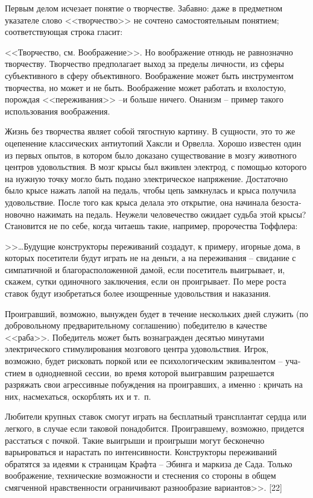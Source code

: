 \documentclass{book}
\begin{document}
Первым делом исчезает понятие о творчестве. Забавно: да­же в предметном указателе слово <<творчество>> не сочтено са­мостоятельным понятием; соответствующая строка гласит:

<<Творчество,  см. Воображение>>.  Но воображение отнюдь не равнозначно творчеству. Творчество предполагает выход за пределы личности, из сферы субъективного в сферу объективного. Воображение может быть инструментом творчества, но может и не быть. Воображение может работать и вхолостую, порож­дая <<переживания>> --и больше ничего. Онанизм -- пример та­кого использования воображения.

Жизнь без творчества являет собой тягостную картину. В сущ­ности, это то же оцепенение классических антиутопий Хаксли и Орвелла. Хорошо известен один из первых опытов, в котором было доказано существование в мозгу животного центров удо­вольствия. В мозг крысы был вживлен электрод, с помощью которого на нужную точку могло быть подано электрическое напряжение. Достаточно было крысе нажать лапой на педаль, чтобы цепь замкнулась и крыса получила удовольствие. Пос­ле того как крыса делала это открытие, она начинала безоста­новочно нажимать на педаль. Неужели человечество ожидает судьба этой крысы? Становится не по себе, когда читаешь такие, например, пророчества Тоффлера:

>>\ldots Будущие конструкторы переживаний создадут, к приме­ру, игорные дома, в которых посетители будут играть не на деньги, а на переживания -- свидание с симпатичной и благо­расположенной дамой, если посетитель выигрывает, и, скажем, сутки одиночного заключения, если он проигрывает. По мере роста ставок будут изобретаться более изощренные удовольст­вия и наказания.

Проигравший, возможно, вынужден будет в течение несколь­ких дней служить (по добровольному предварительному согла­шению) победителю в качестве <<раба>>. Победитель может быть вознагражден десятью минутами электрического стимулирова­ния мозгового центра удовольствия. Игрок, возможно, будет рисковать поркой или ее психологическим эквивалентом -- уча­стием в однодневной сессии, во время которой выигравшим разрешается разряжать свои агрессивные побуждения на проиг­равших, а именно : кричать на них, насмехаться, оскорблять их и т.~п.

Любители крупных ставок смогут играть на бесплатный трансплантат сердца или легкого, в случае если таковой пона­добится. Проигравшему, возможно, придется расстаться с поч­кой. Такие выигрыши и проигрыши могут бесконечно варьироваться и нарастать по интенсивности. Конструкторы пережи­ваний обратятся за идеями к страницам Крафта -- Эбинга и мар­киза де Сада. Только воображение, технические возможности и стеснения со стороны в общем смягченной нравственности ограничивают разнообразие вариантов>>. [22]
\end{document}
